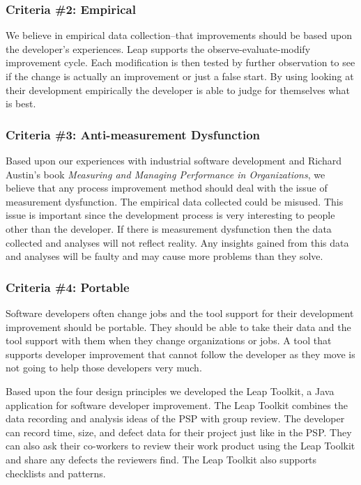 \subsubsection{Criteria \#2: Empirical}

We believe in empirical data collection--that improvements should be based
upon the developer's experiences. Leap supports the observe-evaluate-modify
improvement cycle.  Each modification is then tested by
further observation to see if the change is actually an improvement or just a
false start.  By using looking at their development empirically the developer
is able to judge for themselves what is best.

\subsubsection{Criteria \#3: Anti-measurement Dysfunction}

Based upon our experiences with industrial software development and Richard
Austin's book {\em Measuring and Managing Performance in
  Organizations}\cite{Austin96}, we believe that any process improvement method
should deal with the issue of measurement dysfunction. The empirical data
collected could be misused.  This issue is important since the development
process is very interesting to people other than the developer.  If there is
measurement dysfunction then the data collected and analyses will not reflect
reality.  Any insights gained from this data and analyses will be faulty and
may cause more problems than they solve.

\subsubsection{Criteria \#4: Portable}

Software developers often change jobs and the tool support for their
development improvement should be portable.  They should be able to take their
data and the tool support with them when they change organizations or jobs. A
tool that supports developer improvement that cannot follow the developer as
they move is not going to help those developers very much.


Based upon the four design principles we developed the Leap Toolkit, a Java
application for software developer improvement.  The Leap Toolkit combines the
data recording and analysis ideas of the PSP with group review.  The developer
can record time, size, and defect data for their project just like in the PSP.
They can also ask their co-workers to review their work product using the Leap
Toolkit and share any defects the reviewers find.  The Leap Toolkit also
supports checklists and patterns. 


